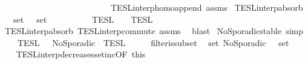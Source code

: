 \begin{isabellebody}
\ \ \ \ \ \ \ \ \ \ \ \ \ \ \ \ \ \ \ \ \ \ \ \ \ \ TESL{\isacharunderscore}interp{\isacharunderscore}homo{\isacharunderscore}append\ assms{\isacharparenright}%
\endisatagproof
{\isafoldproof}%
%
\isadelimproof
\isanewline
%
\endisadelimproof
\isanewline
{}\isamarkupfalse%
\ TESL{\isacharunderscore}interp{\isacharunderscore}absorb{}{\isacharcolon}\isanewline
\ \ \ {\isacartoucheopen}set\ {\isasymPhi}\ {\isasymsubseteq}\ set\ {\isasymPhi}\isanewline
\ \ \ \ \ {\isacartoucheopen}{\isasymlbrakk}{\isasymlbrakk}\ {\isasymPhi}\ {\isacharat}\ {\isasymPhi}\ {\isasymrbrakk}{\isasymrbrakk}\isactrlsub T\isactrlsub E\isactrlsub S\isactrlsub L\ {\isacharequal}\ {\isasymlbrakk}{\isasymlbrakk}\ {\isasymPhi}\ {\isasymrbrakk}{\isasymrbrakk}\isactrlsub T\isactrlsub E\isactrlsub S\isactrlsub L{\isacartoucheclose}\isanewline
%
\isadelimproof
%
\endisadelimproof
%
\isatagproof
{}\isamarkupfalse%
\ TESL{\isacharunderscore}interp{\isacharunderscore}absorb{}\ TESL{\isacharunderscore}interp{\isacharunderscore}commute\ assms\ \isamarkupfalse%
\ blast%
\endisatagproof
{\isafoldproof}%
%
\isadelimproof
%
\endisadelimproof
%
\isadelimdocument
%
\endisadelimdocument
%
\isatagdocument
%
\isamarkuptrue%
%
\endisatagdocument
{\isafolddocument}%
%
\isadelimdocument
%
\endisadelimdocument
{}\isamarkupfalse%
\ NoSporadic{\isacharunderscore}stable\ {\isacharbrackleft}simp{\isacharbrackright}{\isacharcolon}\isanewline
\ \ {\isacartoucheopen}{\isasymlbrakk}{\isasymlbrakk}\ {\isasymPhi}\ {\isasymrbrakk}{\isasymrbrakk}\isactrlsub T\isactrlsub E\isactrlsub S\isactrlsub L\ {\isasymsubseteq}\ {\isasymlbrakk}{\isasymlbrakk}\ NoSporadic\ {\isasymPhi}\ {\isasymrbrakk}{\isasymrbrakk}\isactrlsub T\isactrlsub E\isactrlsub S\isactrlsub L{\isacartoucheclose}\isanewline
%
\isadelimproof
%
\endisadelimproof
%
\isatagproof
{}\isamarkupfalse%
\ {\isacharminus}\isanewline
\ \ \isamarkupfalse%
\ filter{\isacharunderscore}is{\isacharunderscore}subset\ \isamarkupfalse%
\ {\isacartoucheopen}set\ {\isacharparenleft}NoSporadic\ {\isasymPhi}{\isacharparenright}\ {\isasymsubseteq}\ set\ {\isasymPhi}{\isacartoucheclose}\ \isacommand{{\isachardot}}\isamarkupfalse%
\isanewline
\ \ \isamarkupfalse%
\ TESL{\isacharunderscore}interp{\isacharunderscore}decreases{\isacharunderscore}setinc{\isacharbrackleft}OF\ this{\isacharbrackright}\ \isamarkupfalse%

\end{isabellebody}
